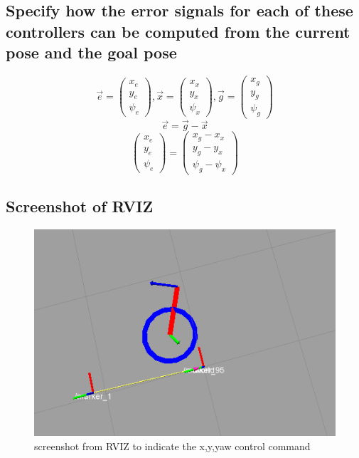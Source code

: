 \documentclass[14pt,a4paper]{article}
\begin{document}
	\subsection{Specify how the error signals for each of these controllers can be computed from the current pose and the goal pose}
				\[\vec{e}= \left( \begin{array}{c}
						x_{e} \\ y_{e}\\ \psi_e 
				\end{array}\right) , \vec{x}= \left( \begin{array}{c}
						x_{x} \\ y_{x}\\ \psi_x 
				\end{array}\right), \vec{g}= \left( \begin{array}{c}
						x_{g} \\ y_{g}\\ \psi_g 
				\end{array}\right)\] 	
		$$
				\vec{e} = \vec{g} - \vec{x}
		$$
				\[\left( \begin{array}{c}
						x_{e} \\ y_{e}\\ \psi_e 
				\end{array}\right)= \left( \begin{array}{c}
						x_{g} - x_{x} \\ y_{g}- y_{x} \\ \psi_g - \psi_x 
				\end{array}\right)\] 
				
	\subsection{Screenshot of RVIZ}
	\begin{figure}[htbp]
	\centering
	\includegraphics[width=\textwidth]{control_flight.png}
  	\caption{screenshot from RVIZ to indicate the x,y,yaw control command}
    \label{graph:RVIZ control}
	\end{figure}
	
\end{document}
